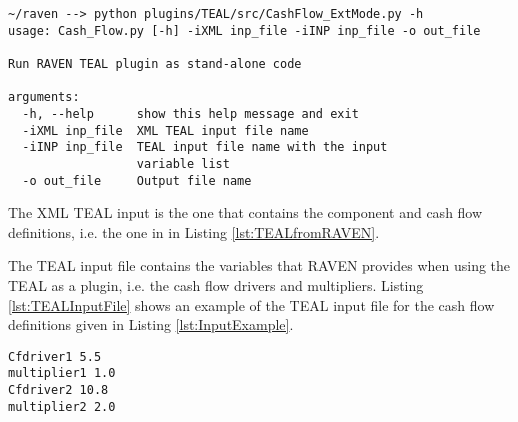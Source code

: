 \small
\begin{lstlisting}[caption=TEAL run as stand-alone python code, label=lst:TEALAsCode]
~/raven --> python plugins/TEAL/src/CashFlow_ExtMode.py -h
usage: Cash_Flow.py [-h] -iXML inp_file -iINP inp_file -o out_file

Run RAVEN TEAL plugin as stand-alone code

arguments:
  -h, --help      show this help message and exit
  -iXML inp_file  XML TEAL input file name
  -iINP inp_file  TEAL input file name with the input
                  variable list
  -o out_file     Output file name
\end{lstlisting}
\normalsize

The XML TEAL input is the one that contains the component and cash flow definitions, i.e. the one in  in Listing \ref{lst:TEALfromRAVEN}.

The TEAL input file contains the variables that RAVEN provides when using the TEAL as a plugin, i.e. the cash flow drivers and multipliers. Listing \ref{lst:TEALInputFile} shows an example of the TEAL input file for the cash flow definitions given in Listing \ref{lst:InputExample}.

\begin{lstlisting}[caption=TEAL run as stand-alone python code, label=lst:TEALInputFile]
Cfdriver1 5.5
multiplier1 1.0
Cfdriver2 10.8
multiplier2 2.0
\end{lstlisting}
